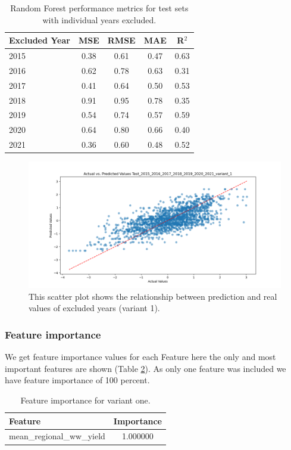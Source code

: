 \documentclass{article}
\begin{document}
\begin{table}[H]
	\centering
	\begin{tabular}{lcccc}
		\hline
		Excluded Year & MSE  & RMSE & MAE  & R$^2$ \\
		\hline
		2015          & 0.38 & 0.61 & 0.47 & 0.63  \\
		2016          & 0.62 & 0.78 & 0.63 & 0.31  \\
		2017          & 0.41 & 0.64 & 0.50 & 0.53  \\
		2018          & 0.91 & 0.95 & 0.78 & 0.35  \\
		2019          & 0.54 & 0.74 & 0.57 & 0.59  \\
		2020          & 0.64 & 0.80 & 0.66 & 0.40  \\
		2021          & 0.36 & 0.60 & 0.48 & 0.52  \\
		\hline
	\end{tabular}
	\caption{\label{table:errors_on_datasets_years_variant_1} Random Forest performance metrics for test sets with individual years excluded.}
\end{table}

\begin{figure}[H]
	\centering
	\includegraphics[width=1.0\textwidth]{./plots/scatter_Test_2015_2016_2017_2018_2019_2020_2021_variant_1.png}
	\caption{\label{fig:scatter_excluded_years_variant_1}This scatter plot shows the relationship between prediction and real values of excluded years (variant 1).}
\end{figure}

\subsubsection{Feature importance}
We get feature importance values for each Feature here the only and most important features are shown (Table \ref{table:feature_importance_variant_1}).
As only one feature was included we have feature importance of 100 percent.
\begin{table}[H]
	\centering
	\begin{tabular}{lc}
		\hline
		Feature                   & Importance \\
		\hline
		mean\_regional\_ww\_yield & 1.000000   \\
		\hline
	\end{tabular}
	\caption{\label{table:feature_importance_variant_1} Feature importance for variant one.}
\end{table}
\end{document}
